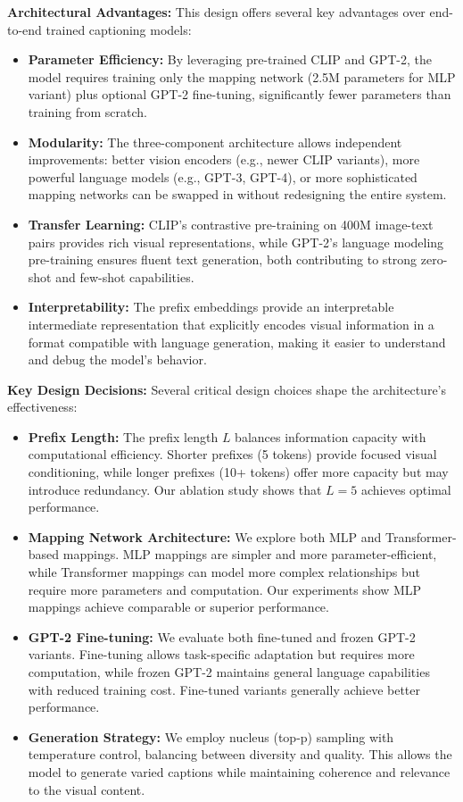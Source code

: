 \documentclass[runningheads]{llncs}
\begin{document}
\textbf{Architectural Advantages:} This design offers several key advantages over end-to-end trained captioning models:
\begin{itemize}
\item \textbf{Parameter Efficiency:} By leveraging pre-trained CLIP and GPT-2, the model requires training only the mapping network (2.5M parameters for MLP variant) plus optional GPT-2 fine-tuning, significantly fewer parameters than training from scratch.
\item \textbf{Modularity:} The three-component architecture allows independent improvements: better vision encoders (e.g., newer CLIP variants), more powerful language models (e.g., GPT-3, GPT-4), or more sophisticated mapping networks can be swapped in without redesigning the entire system.
\item \textbf{Transfer Learning:} CLIP's contrastive pre-training on 400M image-text pairs provides rich visual representations, while GPT-2's language modeling pre-training ensures fluent text generation, both contributing to strong zero-shot and few-shot capabilities.
\item \textbf{Interpretability:} The prefix embeddings provide an interpretable intermediate representation that explicitly encodes visual information in a format compatible with language generation, making it easier to understand and debug the model's behavior.
\end{itemize}

\textbf{Key Design Decisions:} Several critical design choices shape the architecture's effectiveness:
\begin{itemize}
\item \textbf{Prefix Length:} The prefix length $L$ balances information capacity with computational efficiency. Shorter prefixes (5 tokens) provide focused visual conditioning, while longer prefixes (10+ tokens) offer more capacity but may introduce redundancy. Our ablation study shows that $L=5$ achieves optimal performance.
\item \textbf{Mapping Network Architecture:} We explore both MLP and Transformer-based mappings. MLP mappings are simpler and more parameter-efficient, while Transformer mappings can model more complex relationships but require more parameters and computation. Our experiments show MLP mappings achieve comparable or superior performance.
\item \textbf{GPT-2 Fine-tuning:} We evaluate both fine-tuned and frozen GPT-2 variants. Fine-tuning allows task-specific adaptation but requires more computation, while frozen GPT-2 maintains general language capabilities with reduced training cost. Fine-tuned variants generally achieve better performance.
\item \textbf{Generation Strategy:} We employ nucleus (top-p) sampling with temperature control, balancing between diversity and quality. This allows the model to generate varied captions while maintaining coherence and relevance to the visual content.
\end{itemize}
\end{document}
